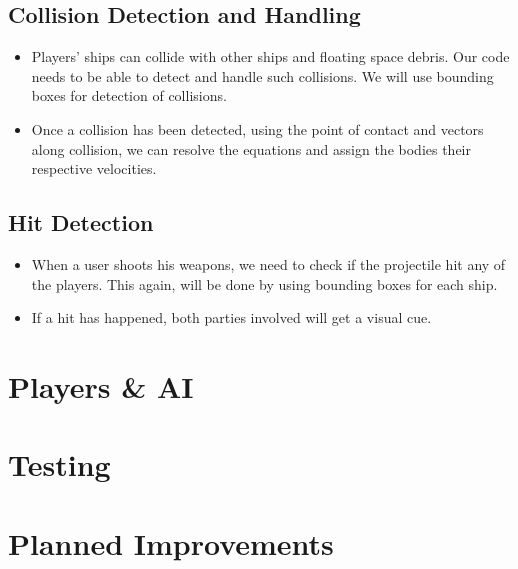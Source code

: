 \documentclass[]{article}
\begin{document}
\subsection{Collision Detection and Handling}
\begin{itemize}
\item Players' ships can collide with other ships and floating space debris. Our code needs to be able to detect and handle such collisions. We will use bounding boxes for detection of collisions.
\item Once a collision has been detected, using the point of contact and vectors along collision, we can resolve the equations and assign the bodies their respective velocities.
\end{itemize}
\subsection{Hit Detection}
\begin{itemize}

\item When a user shoots his weapons, we need to check if the projectile hit any of the players. This again, will be done by using bounding boxes for each ship.
\item If a hit has happened, both parties involved will get a visual cue.
\end{itemize}
\section{Players & AI}
\section{Testing}
\section{Planned Improvements}
\end{document}
